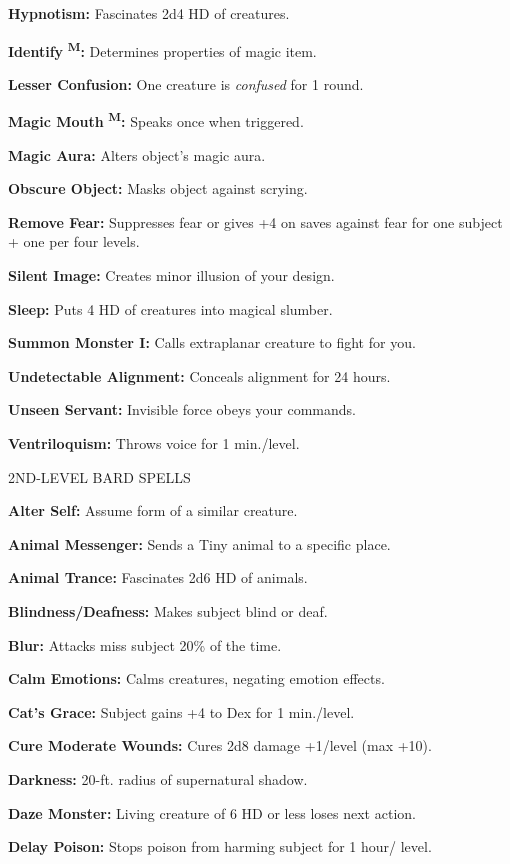\documentclass{article}
\begin{document}
\textbf{Hypnotism:} Fascinates 2d4 HD of creatures.

\textbf{Identify }\textsuperscript{\textbf{M}}\textbf{:} Determines properties 
of magic item.

\textbf{Lesser Confusion:} One creature is \textit{confused }for 1 round.

\textbf{Magic Mouth }\textsuperscript{\textbf{M}}\textbf{:} Speaks once when triggered.

\textbf{Magic Aura:} Alters object's magic aura.

\textbf{Obscure Object: }Masks object against scrying.

\textbf{Remove Fear: }Suppresses fear or gives +4 on saves against fear for one 
subject + one per four levels.

\textbf{Silent Image:} Creates minor illusion of your design.

\textbf{Sleep:} Puts 4 HD of creatures into magical slumber.

\textbf{Summon Monster I:} Calls extraplanar creature to fight for you.

\textbf{Undetectable Alignment:} Conceals alignment for 24 hours.

\textbf{Unseen Servant: }Invisible force obeys your commands.

\textbf{Ventriloquism: }Throws voice for 1 min./level.

2ND-LEVEL BARD SPELLS

\textbf{Alter Self:} Assume form of a similar creature.

\textbf{Animal Messenger:} Sends a Tiny animal to a specific place.

\textbf{Animal Trance:} Fascinates 2d6 HD of animals.

\textbf{Blindness/Deafness: }Makes subject blind or deaf.

\textbf{Blur:} Attacks miss subject 20\% of the time.

\textbf{Calm Emotions:} Calms creatures, negating emotion effects.

\textbf{Cat's Grace:} Subject gains +4 to Dex for 1 min./level.

\textbf{Cure Moderate Wounds:} Cures 2d8 damage +1/level (max +10).

\textbf{Darkness:} 20-ft. radius of supernatural shadow.

\textbf{Daze Monster:} Living creature of 6 HD or less loses next action.

\textbf{Delay Poison:} Stops poison from harming subject for 1 hour/ level.
\end{document}
